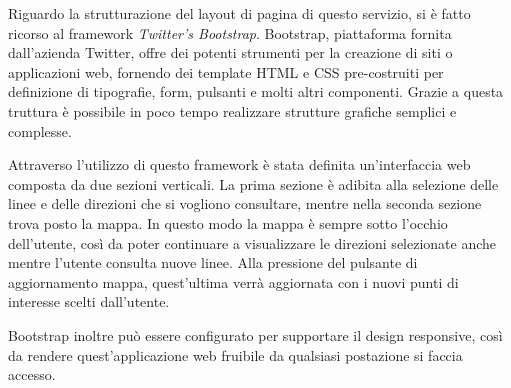 Riguardo la strutturazione del layout di pagina di questo servizio, si è fatto ricorso al framework {\itshape Twitter's Bootstrap}.
Bootstrap, piattaforma fornita dall'azienda Twitter, offre dei potenti strumenti per la creazione di siti o applicazioni web, fornendo dei template HTML e CSS pre-costruiti per definizione di tipografie, form, pulsanti e molti altri componenti. Grazie a questa truttura è possibile in poco tempo realizzare strutture grafiche semplici e complesse.

Attraverso l'utilizzo di questo framework è stata definita un'interfaccia web composta da due sezioni verticali. La prima sezione è adibita alla selezione delle linee e delle direzioni che si vogliono consultare, mentre nella seconda sezione trova posto la mappa. In questo modo la mappa è sempre sotto l'occhio dell'utente, così da poter continuare a visualizzare le direzioni selezionate anche mentre l'utente consulta nuove linee. Alla pressione del pulsante di aggiornamento mappa, quest'ultima verrà aggiornata con i nuovi punti di interesse scelti dall'utente.

Bootstrap inoltre può essere configurato per supportare il design responsive, così da rendere quest'applicazione web fruibile da qualsiasi postazione si faccia accesso.


